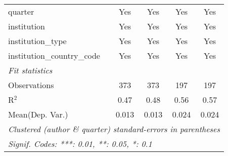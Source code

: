 \begin{tabular}{lcccc}
   quarter                                  & Yes     & Yes     & Yes     & Yes\\  
   institution                              & Yes     & Yes     & Yes     & Yes\\  
   institution\_type                        & Yes     & Yes     & Yes     & Yes\\  
   institution\_country\_code               & Yes     & Yes     & Yes     & Yes\\  
   \midrule
   \emph{Fit statistics}\\
   Observations                             & 373     & 373     & 197     & 197\\  
   R$^2$                                    & 0.47    & 0.48    & 0.56    & 0.57\\  
Mean(Dep. Var.) & 0.013 & 0.013 & 0.024 & 0.024 \\
   \midrule \midrule
   \multicolumn{5}{l}{\emph{Clustered (author \& quarter) standard-errors in parentheses}}\\
   \multicolumn{5}{l}{\emph{Signif. Codes: ***: 0.01, **: 0.05, *: 0.1}}\\
\end{tabular}
\par\endgroup
